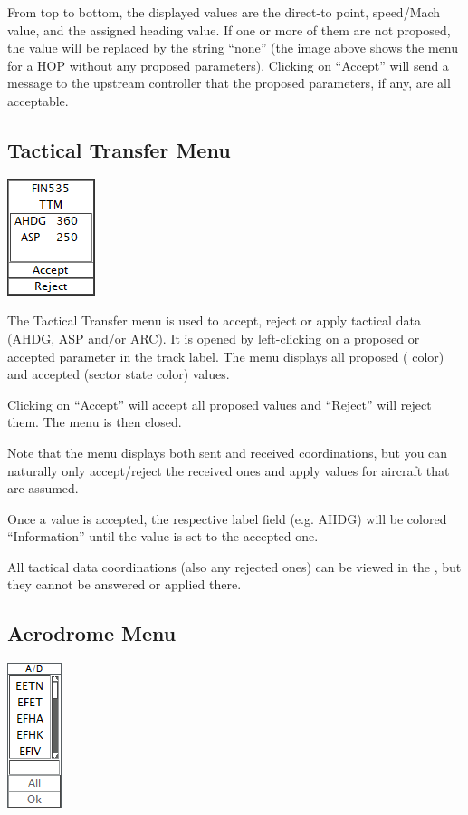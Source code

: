 \documentclass[11pt,a4paper]{memoir}
\newcommand{\colorref}[1]{\textit{\hyperref[#1]{\StrDel{#1}{color:}}}}
\begin{document}
From top to bottom, the displayed values are the direct-to point, speed/Mach value, and the assigned heading value. If one or more of them are not proposed, the value will be replaced by the string “none” (the image above shows the menu for a HOP without any proposed parameters). Clicking on “Accept” will send a message to the upstream controller that the proposed parameters, if any, are all acceptable.

\subsection{Tactical Transfer Menu}
\label{menu:ttm}
\includegraphics{img/ttm.png}

The Tactical Transfer menu is used to accept, reject or apply tactical data (AHDG, ASP and/or ARC). It is opened by left-clicking on a proposed or accepted parameter in the track label. The menu displays all proposed (\colorref{color:Proposition In} color) and accepted (sector state color) values.

Clicking on “Accept” will accept all proposed values and “Reject” will reject them. The menu is then closed.

Note that the menu displays both sent and received coordinations, but you can naturally only accept/reject the received ones and apply values for aircraft that are assumed.

Once a value is accepted, the respective label field (e.g. AHDG) will be colored “Information” until the value is set to the accepted one.

All tactical data coordinations (also any rejected ones) can be viewed in the \textit{}, but they cannot be answered or applied there.

\subsection{Aerodrome Menu}
\label{menu:ad}
\includegraphics{img/ad.png}
\end{document}

